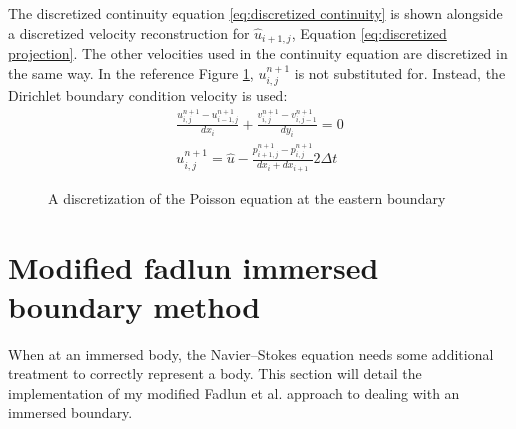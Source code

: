 The discretized continuity equation \eqref{eq:discretized continuity} is shown alongside a discretized velocity reconstruction for $\hat{u}_{i+1,j}$, Equation \eqref{eq:discretized projection}. 
The other velocities used in the continuity equation are discretized in the same way. 
In the reference Figure \ref{fig:ID poisson}, $u_{i,j}^{n+1}$ is not substituted for.
Instead, the Dirichlet boundary condition velocity is used:
\begin{align}
\frac{u_{i,j}^{n+1} - u_{i-1,j}^{n+1}}{dx_i} + \frac{v_{i,j}^{n+1} - v_{i,j-1}^{n+1}}{dy_i} = 0 \label{eq:discretized continuity} \\
u_{i,j}^{n+1} = \hat{u} - \frac{p_{i+1,j}^{n+1} - p_{i,j}^{n+1}}{dx_i + dx_{i+1}}2\Delta t \; \label{eq:discretized projection}
\end{align}
\begin{figure}
	\centering
	
	\caption{A discretization of the Poisson equation at the eastern boundary}
	\label{fig:ID poisson}
\end{figure}

\section{Modified fadlun immersed boundary method}
\label{sec:ID fadlun}
\label{sec:modified fadlun}
When at an immersed body, the Navier--Stokes equation needs some additional treatment to correctly represent a body. 
This section will detail the implementation of my modified Fadlun et al. \cite{Fadlun:2000fl} approach to dealing with an immersed boundary.

